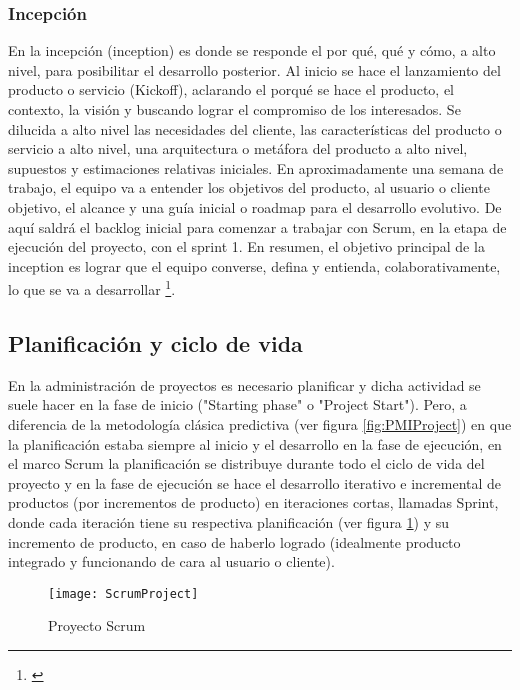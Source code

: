 \subsubsection{Incepción}

En la incepción (inception) es donde se responde el por qué, qué y cómo, a alto nivel, para posibilitar el desarrollo posterior. Al inicio se hace el lanzamiento del producto o servicio (Kickoff), aclarando el porqué se hace el producto, el contexto, la visión y buscando lograr el compromiso de los interesados. Se dilucida a alto nivel las necesidades del cliente, las características del producto o servicio a alto nivel, una arquitectura o metáfora del producto a alto nivel, supuestos y estimaciones relativas iniciales. En aproximadamente una semana de trabajo, el equipo va a entender los objetivos del producto, al usuario o cliente objetivo, el alcance y una guía inicial o roadmap para el desarrollo evolutivo. De aquí saldrá el backlog inicial para comenzar a trabajar con Scrum, en la etapa de ejecución del proyecto, con el sprint 1. En resumen, el objetivo principal de la inception es lograr que el equipo converse, defina y entienda, colaborativamente, lo que se va a desarrollar \footnote{\cite{Caroli-2017}}.

\subsection{Planificación y ciclo de vida}

En la administración de proyectos es necesario planificar y dicha actividad se suele hacer en la fase de inicio ("Starting phase" o "Project Start"). Pero, a diferencia de la metodología clásica predictiva (ver figura \ref{fig:PMIProject}) en que la planificación estaba siempre al inicio y el desarrollo en la fase de ejecución, en el marco Scrum la planificación se distribuye durante todo el ciclo de vida del proyecto y en la fase de ejecución se hace el desarrollo iterativo e incremental de productos (por incrementos de producto) en iteraciones cortas, llamadas Sprint, donde cada iteración tiene su respectiva planificación (ver figura \ref{fig:ScrumProject}) y su incremento de producto, en caso de haberlo logrado (idealmente producto integrado y funcionando de cara al usuario o cliente).

\begin{figure}[h]
  \centering
  \texttt{[image: ScrumProject]}
  \caption{Proyecto Scrum}
  \centering
  \label{fig:ScrumProject} %
\end{figure}
\FloatBarrier %


